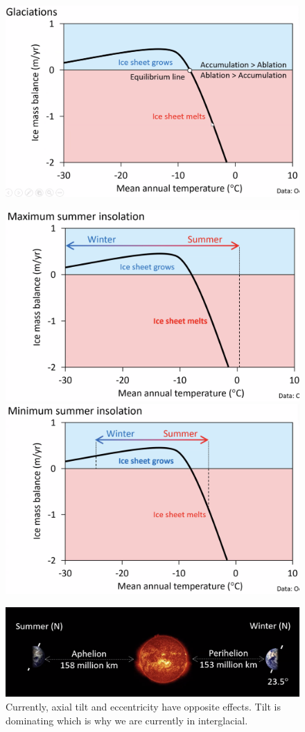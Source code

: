 \begin{figure}[H]
    \centering
    \includegraphics[width=0.75\linewidth]{
    content/img/ice_sheet_equilibrium.png}
\end{figure}

\begin{figure}[H]
    \centering
    \includegraphics[width=0.75\linewidth]{
    content/img/maximum_summer_insolation.png}
    \includegraphics[width=0.75\linewidth]{
    content/img/minimum_summer_insolation.png}
\end{figure}

\begin{figure}[H]
    \centering
    \includegraphics[width=0.75\linewidth]{
    content/img/aphelion_perihelion.png}
    \caption{Currently, axial tilt and eccentricity have opposite effects.
    Tilt is dominating which is why we are currently in interglacial.}
\end{figure}

